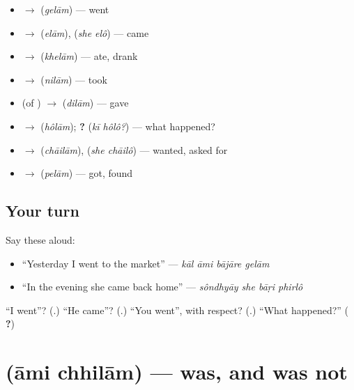 \begin{itemize}
\raggedright
  \item \textbf{} $\to$ \textbf{} (\emph{gelām}) — went
  \item \textbf{} $\to$ \textbf{} (\emph{elām}), \textbf{ } (\emph{she elô}) — came
  \item \textbf{} $\to$ \textbf{} (\emph{khelām}) — ate, drank
  \item \textbf{} $\to$ \textbf{} (\emph{nilām}) — took
  \item \textbf{} (of \textbf{ }) $\to$ \textbf{} (\emph{dilām}) — gave
  \item \textbf{} $\to$ \textbf{} (\emph{hôlām}); \textbf{ ?} (\emph{kī hôlô?}) — what happened?
  \item \textbf{} $\to$ \textbf{} (\emph{chāilām}), \textbf{ } (\emph{she chāilô}) — wanted, asked for
  \item \textbf{} $\to$ \textbf{} (\emph{pelām}) — got, found
\end{itemize}

\subsection*{Your turn}
Say these aloud:

\begin{itemize}
\raggedright
  \item \textquotedblleft{}Yesterday I went to the market\textquotedblright{} — \emph{kāl āmi bājāre gelām}
  \item \textquotedblleft{}In the evening she came back home\textquotedblright{} — \emph{sôndhyāy she bāṛi phirlô}
\end{itemize}

\begin{tcolorbox}[breakable,colback=teal!4,colframe=teal!35!black,title={Before you move on}]
\textquotedblleft{}I went\textquotedblright{}? (\textbf{}.) \textquotedblleft{}He came\textquotedblright{}? (\textbf{}.) \textquotedblleft{}You went\textquotedblright{}, with respect? (\textbf{}.) \textquotedblleft{}What happened?\textquotedblright{} (\textbf{ ?})
\end{tcolorbox}
\section[\texorpdfstring{\bn{আমি} \bn{ছিলাম} (āmi chhilām)}{আমি ছিলাম (āmi chhilām)}]{  (āmi chhilām) — was, and was not}

